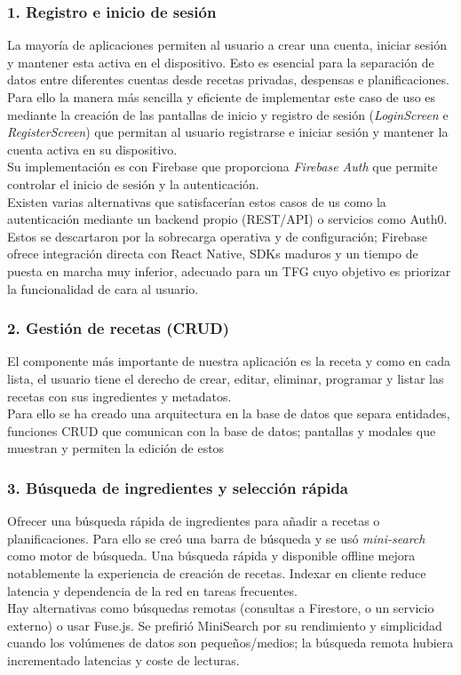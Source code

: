 \documentclass[twoside, openright, 11pt]{report}
\begin{document}
		\subsubsection{1. Registro e inicio de sesión}
		La mayoría de aplicaciones permiten al usuario a crear una cuenta, iniciar sesión y mantener esta activa en el dispositivo. Esto es esencial para la separación de datos entre diferentes cuentas desde recetas privadas, despensas e planificaciones.\\
		Para ello la manera más sencilla y eficiente de implementar este caso de uso es mediante la creación de las pantallas de inicio y registro de sesión (\textit{LoginScreen} e \textit{RegisterScreen}) que permitan al usuario registrarse e iniciar sesión y mantener la cuenta activa en su dispositivo.\\
		Su implementación es con Firebase que proporciona \textit{Firebase Auth} que permite controlar el inicio de sesión y la autenticación.\\
		Existen varias alternativas que satisfacerían estos casos de us como la autenticación mediante un backend propio (REST/API) o servicios como Auth0. Estos se descartaron por la sobrecarga operativa y de configuración; Firebase ofrece integración directa con React Native, SDKs maduros y un tiempo de puesta en marcha muy inferior, adecuado para un TFG cuyo objetivo es priorizar la funcionalidad de cara al usuario.
		
		\subsubsection{2. Gestión de recetas (CRUD)}
		El componente más importante de nuestra aplicación es la receta y como en cada lista, el usuario tiene el derecho de crear, editar, eliminar, programar y listar las recetas con sus ingredientes y metadatos.\\
		Para ello se ha creado una arquitectura en la base de datos que separa entidades, funciones CRUD que comunican con la base de datos; pantallas y modales que muestran y permiten la edición de estos
		
		\subsubsection{3. Búsqueda de ingredientes y selección rápida}
		Ofrecer una búsqueda rápida de ingredientes para añadir a recetas o planificaciones. Para ello se creó una barra de búsqueda y se usó \textit{mini-search} como motor de búsqueda. Una búsqueda rápida y disponible offline mejora notablemente la experiencia de creación de recetas. Indexar en cliente reduce latencia y dependencia de la red en tareas frecuentes.\\
		Hay alternativas como búsquedas remotas (consultas a Firestore, o un servicio externo) o usar Fuse.js. Se prefirió MiniSearch por su rendimiento y simplicidad cuando los volúmenes de datos son pequeños/medios; la búsqueda remota hubiera incrementado latencias y coste de lecturas.
		
\end{document}
